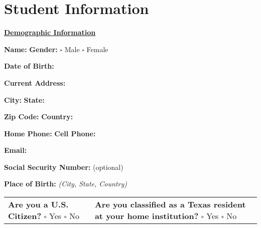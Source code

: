 \documentclass[10pt]{article}
\begin{document}
\section*{Student Information}

{\underline{\textbf{Demographic Information}}}
\begin{center}
\noindent\textbf{\footnotesize Name:}   \hrulefill
\textbf{\footnotesize Gender:} $\square$ \footnotesize Male \quad $\square$ \footnotesize Female  

\vspace{0.4cm}

\textbf{\footnotesize Date of Birth:} \hrulefill  

\vspace{0.4cm}

\noindent\textbf{\footnotesize Current Address:} \hrulefill  

\vspace{0.4cm}

\noindent\textbf{\footnotesize City:} \hrulefill \quad \textbf{\footnotesize State:} \hrulefill  

\vspace{0.4cm}

\noindent\textbf{\footnotesize Zip Code:} \hrulefill \quad \textbf{\footnotesize Country:} \hrulefill  

\vspace{0.4cm}

\noindent\textbf{\footnotesize Home Phone:} \hrulefill \quad \textbf{\footnotesize Cell Phone:} \hrulefill  

\vspace{0.4cm}

\noindent\textbf{\footnotesize Email:} \hrulefill  

\vspace{0.4cm}

\noindent\textbf{\footnotesize Social Security Number:} \hrulefill (optional)  

\vspace{0.4cm}

\noindent\textbf{\footnotesize Place of Birth:} \hrulefill \quad \textit{(\footnotesize City, State, Country)}  

\begin{tabular}{p{8cm} p{8cm}}
\textbf{\footnotesize Are you a U.S. Citizen?} $\square$ Yes \quad $\square$ No &  
\textbf{\footnotesize Are you classified as a Texas resident at your home institution?} $\square$ Yes \quad $\square$ No  
\end{tabular} 


\end{center}
\end{document}
